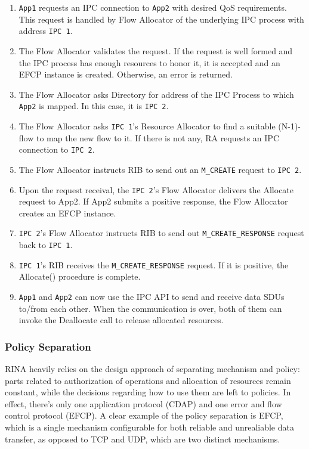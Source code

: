                 \begin{enumerate}
                    \item \texttt{App1} requests an IPC connection to \texttt{App2} with desired QoS requirements. This request is handled by Flow Allocator of the underlying IPC process with address \texttt{IPC 1}.
                    \item The Flow Allocator validates the request. If the request is well formed and the IPC process has enough resources to honor it, it is accepted and an EFCP instance is created. Otherwise, an error is returned.
                    \item The Flow Allocator asks Directory for address of the IPC Process to which \texttt{App2} is mapped. In this case, it is \texttt{IPC 2}.
                    \item The Flow Allocator asks \texttt{IPC 1}'s Resource Allocator to find a suitable (N-1)-flow to map the new flow to it. If there is not any, RA requests an IPC connection to \texttt{IPC 2}.
                    \item The Flow Allocator instructs RIB to send out an \texttt{M\_CREATE} request to \texttt{IPC 2}.
                    \item Upon the request receival, the \texttt{IPC 2}'s Flow Allocator delivers the Allocate request to App2. If App2 submits a positive response, the Flow Allocator creates an EFCP instance.
                    \item \texttt{IPC 2}'s Flow Allocator instructs RIB to send out \texttt{M\_CREATE\_RESPONSE} request back to \texttt{IPC 1}.
                    \item \texttt{IPC 1}'s RIB receives the \texttt{M\_CREATE\_RESPONSE} request. If it is positive, the Allocate() procedure is complete.
                    \item \texttt{App1} and \texttt{App2} can now use the IPC API to send and receive data SDUs to/from each other. When the communication is over, both of them can invoke the Deallocate call to release allocated resources.
                \end{enumerate}

            \subsubsection{Policy Separation}

                RINA heavily relies on the design approach of separating mechanism and policy: parts related to authorization of operations and allocation of resources remain constant, while the decisions regarding how to use them are left to policies. In effect, there's only one application protocol (CDAP) and one error and flow control protocol (EFCP). A clear example of the policy separation is EFCP, which is a single mechanism configurable for both reliable and unrealiable data transfer, as opposed to TCP and UDP, which are two distinct mechanisms.

